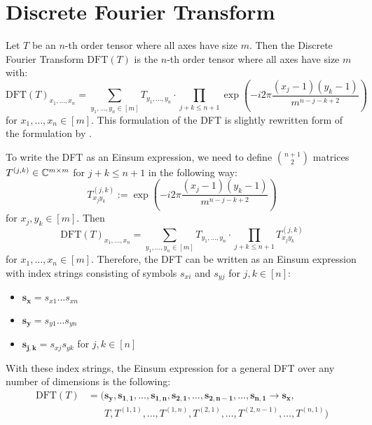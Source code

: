 \section{Discrete Fourier Transform}
Let $T$ be an $n$-th order tensor where all axes have size $m$.
Then the Discrete Fourier Transform $\text{DFT}(T)$ is the $n$-th order tensor where all axes have size $m$ with:
$$\text{DFT}(T)_{x_1,\dots,x_n} = \sum\limits_{y_1,\dots,y_n \in [m]} T_{y_1, \dots, y_n} \cdot \prod\limits_{j + k \leq n + 1} \exp\left(-i2\pi \frac{(x_j - 1) (y_k - 1)}{m^{n - j - k + 2}}\right)$$
for $x_1,\dots,x_n \in [m]$.
This formulation of the DFT is slightly rewritten form of the formulation by \citet{Aji2000}.

To write the DFT as an Einsum expression, we need to define $\binom{n + 1}{2}$ matrices $T^{(j,k)} \in \mathbb{C}^{m \times m}$ for $j + k \leq n + 1$ in the following way:
$$T^{(j,k)}_{x_j y_k} := \exp\left(-i2\pi \frac{(x_j - 1) (y_k - 1)}{m^{n - j - k + 2}}\right)$$
for $x_j, y_k \in [m]$.
Then
$$\text{DFT}(T)_{x_1,\dots,x_n} = \sum\limits_{y_1,\dots,y_n \in [m]} T_{y_1, \dots, y_n} \cdot \prod\limits_{j + k \leq n + 1} T^{(j,k)}_{x_j y_k}$$
for $x_1,\dots,x_n \in [m]$.
Therefore, the DFT can be written as an Einsum expression with index strings consisting of symbols $s_{xi}$ and $s_{yj}$ for $j,k \in [n]$:
\begin{itemize}
    \item $\bm{s_x} = s_{x1}\dots s_{x n}$
    \item $\bm{s_y} = s_{y1}\dots s_{y n}$
    \item $\bm{s_{j,k}} = s_{xj} s_{yk}$ for $j,k \in [n]$
\end{itemize}
With these index strings, the Einsum expression for a general DFT over any number of dimensions is the following:
\begin{align*}
    \text{DFT}(T) & = (\bm{s_y}, \bm{s_{1,1}}, \dots, \bm{s_{1,n}}, \bm{s_{2,1}}, \dots, \bm{s_{2,n - 1}}, \dots, \bm{s_{n, 1}} \rightarrow \bm{s_x}, \\
                  & \phantom{{}=(} T, T^{(1,1)}, \dots, T^{(1, n)}, T^{(2,1)}, \dots, T^{(2, n-1)}, \dots, T^{(n, 1)})
\end{align*}

